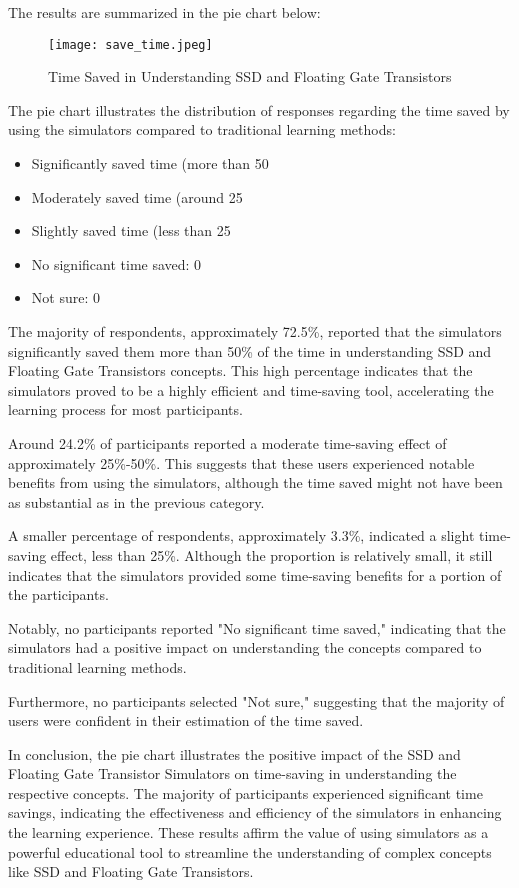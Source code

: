 \documentclass[conference]{/home/habib/Desktop/flash_ssd_simulator_web/paper_writing/latex_file/IEEEtran}
\begin{document}
The results are summarized in the pie chart below:
\begin{figure}[h]
    \centering
    \texttt{[image: save\_time.jpeg]}
    \caption{Time Saved in Understanding SSD and Floating Gate Transistors}
    \label{fig:enter-label}
\end{figure}
The pie chart illustrates the distribution of responses regarding the time saved by using the simulators compared to traditional learning methods:
\begin{itemize}
    \item Significantly saved time (more than 50%
    \item Moderately saved time (around 25%
    \item Slightly saved time (less than 25%
    \item No significant time saved: 0%
    \item Not sure: 0%
\end{itemize}
The majority of respondents, approximately 72.5\%, reported that the simulators significantly saved them more than 50\% of the time in understanding SSD and Floating Gate Transistors concepts. This high percentage indicates that the simulators proved to be a highly efficient and time-saving tool, accelerating the learning process for most participants.

Around 24.2\% of participants reported a moderate time-saving effect of approximately 25\%-50\%. This suggests that these users experienced notable benefits from using the simulators, although the time saved might not have been as substantial as in the previous category.

A smaller percentage of respondents, approximately 3.3\%, indicated a slight time-saving effect, less than 25\%. Although the proportion is relatively small, it still indicates that the simulators provided some time-saving benefits for a portion of the participants.

Notably, no participants reported "No significant time saved," indicating that the simulators had a positive impact on understanding the concepts compared to traditional learning methods.

Furthermore, no participants selected "Not sure," suggesting that the majority of users were confident in their estimation of the time saved.

In conclusion, the pie chart illustrates the positive impact of the SSD and Floating Gate Transistor Simulators on time-saving in understanding the respective concepts. The majority of participants experienced significant time savings, indicating the effectiveness and efficiency of the simulators in enhancing the learning experience. These results affirm the value of using simulators as a powerful educational tool to streamline the understanding of complex concepts like SSD and Floating Gate Transistors.
\end{document}

